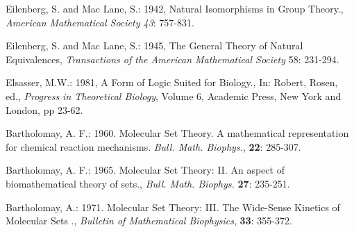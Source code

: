 \documentclass[12pt]{article}
\theoremstyle{plain}
\theoremstyle{definition}
\numberwithin{equation}{section}
\begin{document}
\begin{thebibliography}{9}
Eilenberg, S. and Mac Lane, S.: 1942, Natural Isomorphisms in Group Theory., \emph{American Mathematical Society 43}: 757-831.

Eilenberg, S. and Mac Lane, S.: 1945, The General Theory of Natural Equivalences, 
\emph{Transactions of the American Mathematical Society} 58: 231-294.

Elsasser, M.W.: 1981, A Form of Logic Suited for Biology., In: Robert, Rosen, ed., \emph{Progress in Theoretical Biology},  Volume 6, Academic Press, New York and London, pp 23-62.

Bartholomay, A. F.: 1960. Molecular Set Theory. A mathematical representation for chemical reaction mechanisms. \emph{Bull. Math. Biophys.}, \textbf{22}: 285-307.

Bartholomay, A. F.: 1965. Molecular Set Theory: II. An aspect of biomathematical theory of sets., \emph{Bull. Math. Biophys.} \textbf{27}: 235-251.

Bartholomay, A.: 1971. Molecular Set Theory: III. The Wide-Sense Kinetics of Molecular Sets ., \emph{Bulletin of Mathematical Biophysics}, \textbf{33}: 355-372.

\end{thebibliography}
\end{document}
